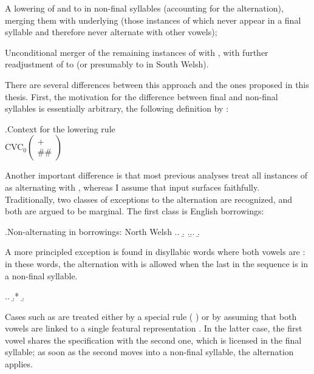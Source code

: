 \begin{itemize*}
\item A lowering of  and  to \ipa{[ə]} in non-final syllables (accounting for the alternation), merging them with underlying  (\ie those instances of  which never appear in a final syllable and therefore never alternate with other vowels);
\item Unconditional merger of the remaining instances of  with , with further readjustment of  to \ipa{[ɨ]} (or presumably to \ipa{[i]} in South Welsh).
\end{itemize*}

There are several differences between this approach and the ones proposed in this thesis. First, the motivation for the difference between final and non\hyp final syllables is essentially arbitrary, \cf the following definition by \citet[p.~113]{thomas84:_north_welsh}:

\ex.Context for the lowering rule\\
\label{ex:lowering-rule-context}\underscore CVC$_{0}\left(\begin{array}{l}+\\\#\#\end{array}\right)$

Another important difference is that most previous analyses treat all instances of \ipa{[u]} as alternating with \ipa{[ə]}, whereas I assume that input \ipa{[u]} surfaces faithfully. Traditionally, two classes of exceptions to the \alternation{[u]}{[ə]} alternation are recognized, and both are argued to be marginal. The first class is English borrowings:

\ex.Non\hyp alternating \ipa{[u]} in borrowings: North Welsh
\a.\a.
\b.
\z.\b.\label{ex:twrna}\a.
\b.

A more principled exception is found in disyllabic words where both vowels are \ipa{[u]}: in these words, the alternation with \ipa{[ə]} is allowed when the last \ipa{[u]} in the sequence is in a non\hyp final syllable.

\ex.\a.
\b.*\mbi{[ˈkəmul]}
\b.

Cases such as \ipa{[ˈkumul]} are treated either by a special rule (\citeauthor{thomas84:_north_welsh} \cite*{thomas84:_north_welsh}) or by assuming that both vowels are linked to a single featural representation \citep{hannahs07:_const_welsh}. In the latter case, the first vowel shares the specification with the second one, which is licensed in the final syllable; as soon as the second \ipa{[u]} moves into a non-final syllable, the alternation applies.

